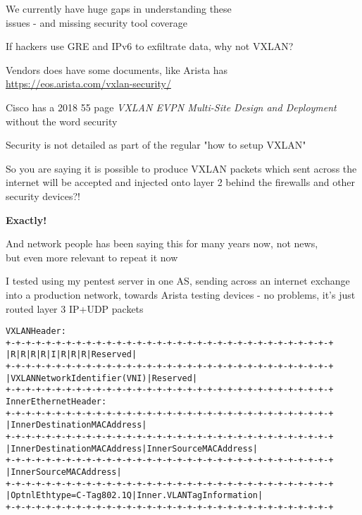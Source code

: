 \documentclass[Screen16to9,17pt]{foils}
\begin{document}
\vskip 1cm
{\Large We currently have huge gaps in understanding these\\
issues - and missing security tool coverage}

\vskip 5mm

{\small If hackers use GRE and IPv6 to exfiltrate data, why not VXLAN?}


\begin{list2}
\item Vendors does have some documents, like Arista has\\ \url{https://eos.arista.com/vxlan-security/}
\item Cisco has a 2018 55 page \emph{VXLAN EVPN Multi-Site
Design and Deployment} \\
without the word security \smiley
\item Security is not detailed as part of the regular "how to setup VXLAN"
\end{list2}



\vskip 2cm
So you are saying it is possible to produce VXLAN packets which sent across the internet will be accepted and injected onto layer 2 behind the firewalls and other security devices?!

\vskip 1cm
{\bf\LARGE Exactly!}

\vskip 2cm
And network people has been saying this for many years now, not news,\\
but even more relevant to repeat it now


I tested using my pentest server in one AS, sending across an internet exchange into a production network, towards Arista testing devices - no problems, it's just routed layer 3 IP+UDP packets


\begin{alltt}\footnotesize
VXLAN Header:
+-+-+-+-+-+-+-+-+-+-+-+-+-+-+-+-+-+-+-+-+-+-+-+-+-+-+-+-+-+-+-+-+
|R|R|R|R|I|R|R|R|            Reserved                           |
+-+-+-+-+-+-+-+-+-+-+-+-+-+-+-+-+-+-+-+-+-+-+-+-+-+-+-+-+-+-+-+-+
|                VXLAN Network Identifier (VNI) |   Reserved    |
+-+-+-+-+-+-+-+-+-+-+-+-+-+-+-+-+-+-+-+-+-+-+-+-+-+-+-+-+-+-+-+-+
Inner Ethernet Header:
+-+-+-+-+-+-+-+-+-+-+-+-+-+-+-+-+-+-+-+-+-+-+-+-+-+-+-+-+-+-+-+-+
|             Inner Destination MAC Address                     |
+-+-+-+-+-+-+-+-+-+-+-+-+-+-+-+-+-+-+-+-+-+-+-+-+-+-+-+-+-+-+-+-+
| Inner Destination MAC Address | Inner Source MAC Address      |
+-+-+-+-+-+-+-+-+-+-+-+-+-+-+-+-+-+-+-+-+-+-+-+-+-+-+-+-+-+-+-+-+
|                Inner Source MAC Address                       |
+-+-+-+-+-+-+-+-+-+-+-+-+-+-+-+-+-+-+-+-+-+-+-+-+-+-+-+-+-+-+-+-+
|OptnlEthtype = C-Tag 802.1Q    | Inner.VLAN Tag Information    |
+-+-+-+-+-+-+-+-+-+-+-+-+-+-+-+-+-+-+-+-+-+-+-+-+-+-+-+-+-+-+-+-+
\end{alltt}
\end{document}
